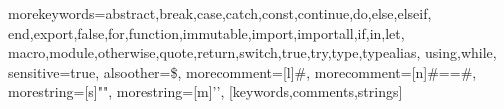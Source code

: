 
\DeclarePairedDelimiter\bra{\langle}{\rvert}
\DeclarePairedDelimiter\ket{\lvert}{\rangle}
\DeclarePairedDelimiterX{}
\DeclarePairedDelimiter{\ceil}{\lceil}{\rceil}
\DeclarePairedDelimiter{\floor}{\lfloor}{\rfloor}

\DeclarePairedDelimiter{\norm}{||}{||}

\renewcommand{\vec}[1]{\bm{#1}}
\newcommand\caret{\text{\textasciicircum}}


\newcommand{\cnc}[1]{\mathtt{#1}}

\newcommand{\grad}{\vec\nabla}
\renewcommand{\div}{\vec{\nabla} \cdot}
\newcommand{\curl}{\vec{\nabla} \times}

\newcommand{\mat}[1]{\underline{\underline{#1}}}
\newcommand{\Hess}{\mat{\mathrm{Hess}}}

\newcommand{\degree}{^\circ}
\newcommand{\N}{\mathbb{N}}
\newcommand{\Z}{\mathbb{Z}}
\newcommand{\Q}{\mathbb{Q}}
\newcommand{\R}{\mathbb{R}}
\newcommand{\C}{\mathbb{C}}
\renewcommand{\i}{\mathrm{i}}
\newcommand{\M}{\mathcal{M}}
\renewcommand{\L}{\mathcal{L}}
\renewcommand{\O}{\mathcal{O}}
\newcommand{\Id}{{\mathbb{1}}}
\newcommand{\Diag}{\mat{Diag}}

\newcommand{\unit}[1]{\mathrm{#1}}

%
  {morekeywords={abstract,break,case,catch,const,continue,do,else,elseif,%
      end,export,false,for,function,immutable,import,importall,if,in,let,%
      macro,module,otherwise,quote,return,switch,true,try,type,typealias,%
      using,while},%
   sensitive=true,%
   alsoother={\$},%
   morecomment=[l]\#,%
   morecomment=[n]{\#=}{=\#},%
   morestring=[s]{"}{"},%
   morestring=[m]{'}{'},%
}[keywords,comments,strings]%